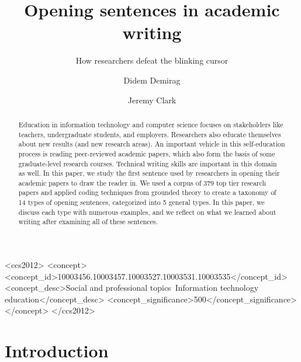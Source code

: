 \documentclass[sigconf,anonymous]{acmart}
\begin{document}
	
\title{Opening sentences in academic writing}
\subtitle{How researchers defeat the blinking cursor}

\author{Didem Demirag}
\author{Jeremy Clark}
	
\begin{abstract}

Education in information technology and computer science focuses on stakeholders like teachers, undergraduate students, and employers. Researchers also educate themselves about new results (and new research areas). An important vehicle in this self-education process is reading peer-reviewed academic papers, which also form the basis of some graduate-level research courses. Technical writing skills are important in this domain as well. In this paper, we study the first sentence used by researchers in opening their academic papers to draw the reader in. We used a corpus of 379 top tier research papers and applied coding techniques from grounded theory to create a taxonomy of 14 types of opening sentences, categorized into 5 general types. In this paper, we discuss each type with numerous examples, and we reflect on what we learned about writing after examining all of these sentences.

\end{abstract}
	
\begin{CCSXML}
<ccs2012>
   <concept>
       <concept_id>10003456.10003457.10003527.10003531.10003535</concept_id>
       <concept_desc>Social and professional topics~Information technology education</concept_desc>
       <concept_significance>500</concept_significance>
       </concept>
 </ccs2012>
\end{CCSXML}

	
	
\maketitle
	
	
\section{Introduction}
 
\end{document}
